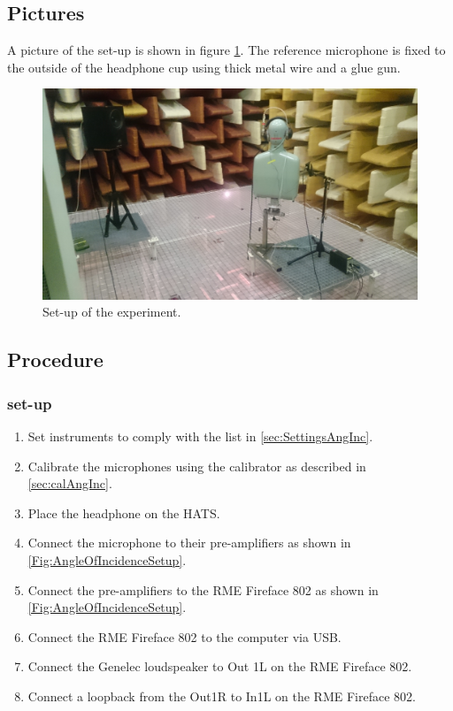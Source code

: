 \subsection{Pictures}
A picture of the set-up is shown in figure \ref{AngIncidenceSetup}. The reference microphone is fixed to the outside of the headphone cup using thick metal wire and a glue gun.  
\begin{figure}[H]
	\includegraphics[width=\textwidth]{../Journal/Experiments/AngleOfIncidence/AngInSetup.jpg}
	\caption{Set-up of the experiment.}
	\label{AngIncidenceSetup}	
\end{figure}


\subsection{Procedure}
\subsubsection{set-up}
\begin{enumerate}
	\item Set instruments to comply with the list in \ref{sec:SettingsAngInc}.
	\item Calibrate the microphones using the calibrator as described in \autoref{sec:calAngInc}.
	\item Place the headphone on the HATS.
	\item Connect the microphone to their pre-amplifiers as shown in \autoref{Fig:AngleOfIncidenceSetup}. 
	\item Connect the pre-amplifiers to the RME Fireface 802 as shown in \autoref{Fig:AngleOfIncidenceSetup}. 
	\item Connect the RME Fireface 802 to the computer via USB.
	\item Connect the Genelec loudspeaker to Out 1L on the RME Fireface 802.
	\item Connect a loopback from the Out1R to In1L on the RME Fireface 802.
\end{enumerate}


